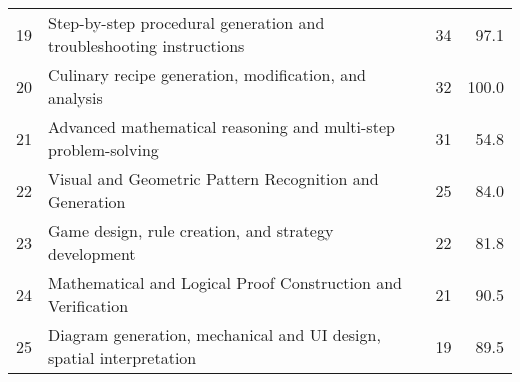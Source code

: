\begin{table}[h!]
{\begin{tabular}{r l r r}
19 & Step-by-step procedural generation and troubleshooting instructions & 34 & 97.1 \\
20 & Culinary recipe generation, modification, and analysis & 32 & 100.0 \\
21 & Advanced mathematical reasoning and multi-step problem-solving & 31 & 54.8 \\
22 & Visual and Geometric Pattern Recognition and Generation & 25 & 84.0 \\
23 & Game design, rule creation, and strategy development & 22 & 81.8 \\
24 & Mathematical and Logical Proof Construction and Verification & 21 & 90.5 \\
25 & Diagram generation, mechanical and UI design, spatial interpretation & 19 & 89.5 \\
\bottomrule
\end{tabular}}
\end{table}

